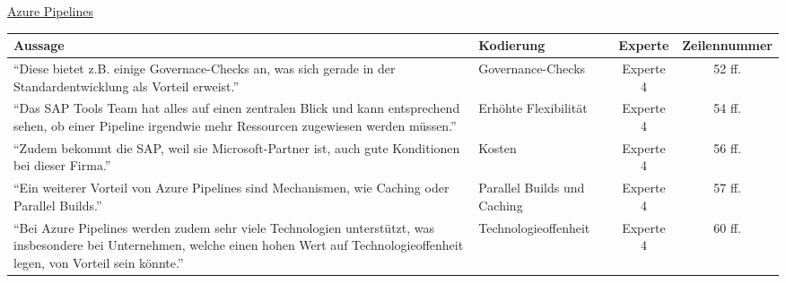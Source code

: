        
    \underline{Azure Pipelines}\\
    \begin{longtable}{ |C{6cm}|C{3cm}|c|c| }
        \hline
        Aussage & Kodierung & Experte & Zeilennummer\\
        \hline
        \enquote{Diese bietet z.B. einige Governace-Checks an, was sich gerade in der Standardentwicklung als Vorteil erweist.} & Governance-Checks & Experte 4 & 52 ff. \\
        \hline
        \enquote{Das SAP Tools Team hat  alles auf einen zentralen Blick und kann entsprechend sehen, ob einer Pipeline irgendwie mehr Ressourcen zugewiesen werden müssen.} & Erhöhte Flexibilität & Experte 4 & 54 ff. \\
        \hline
        \enquote{Zudem bekommt die SAP, weil sie Microsoft-Partner ist, auch gute Konditionen bei dieser Firma.} & Kosten & Experte 4 & 56 ff. \\
        \hline
        \enquote{Ein weiterer Vorteil von Azure Pipelines sind Mechanismen, wie Caching oder Parallel Builds.} & Parallel Builds und Caching & Experte 4 & 57 ff. \\
        \hline
        \enquote{Bei Azure Pipelines werden zudem sehr viele Technologien unterstützt, was insbesondere bei Unternehmen, welche einen hohen Wert auf Technologieoffenheit legen, von Vorteil sein könnte.} & Technologieoffenheit & Experte 4 & 60 ff. \\
        \hline
        \end{longtable}

